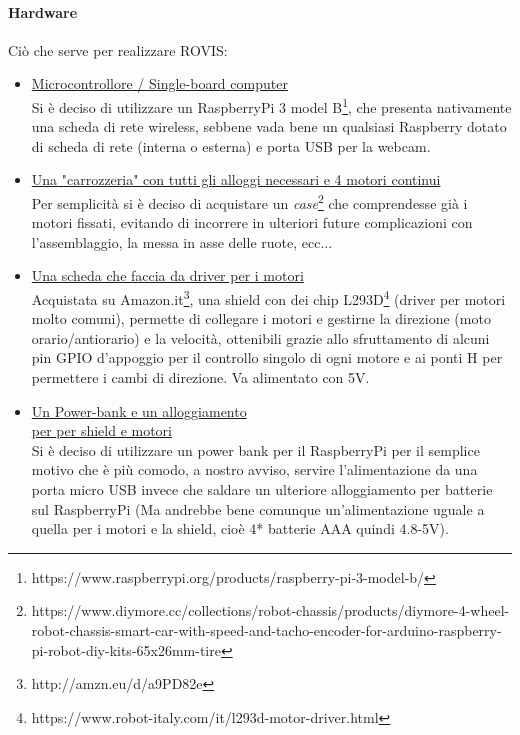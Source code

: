 \documentclass[11pt]{article}
\begin{document}
\paragraph{Hardware}
Ciò che serve per realizzare ROVIS:
\begin{itemize}
\item \underline{Microcontrollore / Single-board computer}\\
Si è deciso di utilizzare un RaspberryPi 3 model B\footnote{https://www.raspberrypi.org/products/raspberry-pi-3-model-b/}, che presenta nativamente una scheda di rete wireless, sebbene vada bene un qualsiasi Raspberry dotato di scheda di rete (interna o esterna) e porta USB per la webcam.
\item \underline{Una "carrozzeria" con tutti gli alloggi necessari e 4 motori continui}\\
Per semplicità si è deciso di acquistare un \textit{case}\footnote{https://www.diymore.cc/collections/robot-chassis/products/diymore-4-wheel-robot-chassis-smart-car-with-speed-and-tacho-encoder-for-arduino-raspberry-pi-robot-diy-kits-65x26mm-tire} che comprendesse già i motori fissati, evitando di incorrere in ulteriori future complicazioni con l'assemblaggio, la messa in asse delle ruote, ecc...\\
\item \underline{Una scheda che faccia da driver per i motori}\\
Acquistata su Amazon.it\footnote{http://amzn.eu/d/a9PD82e}, una shield con dei chip L293D\footnote{https://www.robot-italy.com/it/l293d-motor-driver.html} (driver per motori molto comuni), permette di collegare i motori e gestirne la direzione (moto orario/antiorario)  e la velocità, ottenibili grazie allo sfruttamento di alcuni pin GPIO d'appoggio per il controllo singolo di ogni motore e ai ponti H per permettere i cambi di direzione. Va alimentato con 5V.
\item \underline{Un Power-bank e un alloggiamento\\ per per shield e motori} \\
Si è deciso di utilizzare un power bank per il RaspberryPi per il semplice motivo che è più comodo, a nostro avviso, servire l'alimentazione da una porta micro USB invece che saldare un ulteriore alloggiamento per batterie sul RaspberryPi (Ma andrebbe bene comunque un'alimentazione uguale a quella per i motori e la shield, cioè 4* batterie AAA quindi 4.8-5V).

\end{itemize}
\end{document}
